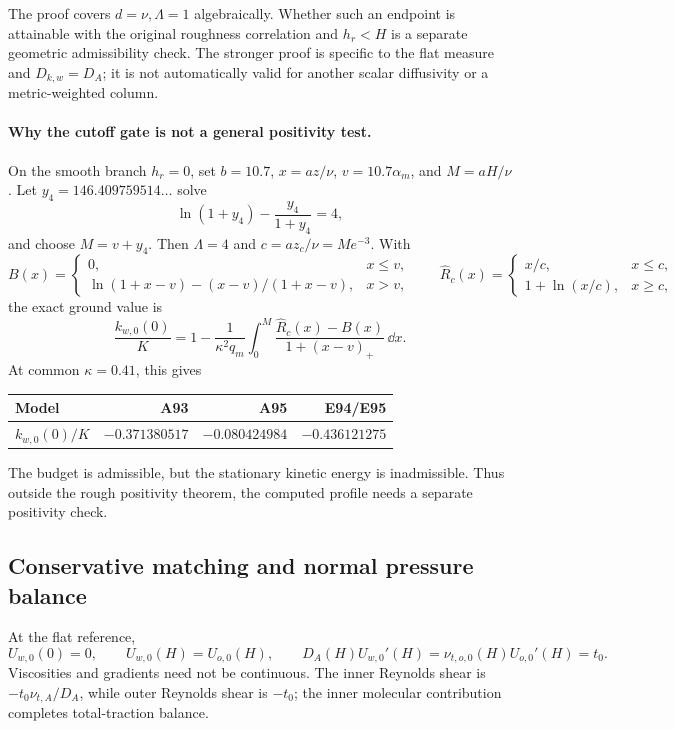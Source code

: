The proof covers \(d=\nu,\Lambda=1\) algebraically.
Whether such an endpoint is attainable with the original
roughness correlation and \(h_r<H\) is a separate geometric
admissibility check. The stronger proof is specific to the
flat measure and \(D_{k,w}=D_A\); it is not automatically valid
for another scalar diffusivity or a metric-weighted column.

\paragraph{Why the cutoff gate is not a general positivity test.}
On the smooth branch \(h_r=0\), set \(b=10.7\),
\(x=az/\nu\), \(v=10.7\alpha_m\), and
\(M=aH/\nu\). Let \(y_4=146.409759514\ldots\) solve
\[
 \ln(1+y_4)-\frac{y_4}{1+y_4}=4,
\]
and choose \(M=v+y_4\). Then \(\Lambda=4\) and
\(c=az_c/\nu=M e^{-3}\). With
\[
 B(x)=
 \begin{cases}
 0,&x\le v,\\
 \ln(1+x-v)-(x-v)/(1+x-v),&x>v,
 \end{cases}
 \qquad
 \widehat R_c(x)=
 \begin{cases}x/c,&x\le c,\\1+\ln(x/c),&x\ge c,\end{cases}
\]
the exact ground value is
\begin{equation}
 \frac{k_{w,0}(0)}K
 =1-\frac{1}{\kappa^2q_m}
   \int_0^M\frac{\widehat R_c(x)-B(x)}{1+(x-v)_+}\,\dd x.
 \label{mawf:smooth-counterexample}
\end{equation}
At common \(\kappa=0.41\), this gives
\begin{center}
\begin{tabular}{@{}lrrr@{}}
\toprule
Model&A93&A95&E94/E95\\
\midrule
\(k_{w,0}(0)/K\)&\(-0.371380517\)&\(-0.080424984\)&\(-0.436121275\)\\
\bottomrule
\end{tabular}
\end{center}
The budget is admissible, but the stationary kinetic energy is
inadmissible. Thus outside the rough positivity theorem,
the computed profile needs a separate positivity check.

\subsection{Conservative matching and normal pressure balance}
\label{mawf:matching}
At the flat reference,
\begin{equation}
 U_{w,0}(0)=0,\qquad U_{w,0}(H)=U_{o,0}(H),\qquad
 D_A(H)U_{w,0}'(H)=\nu_{t,o,0}(H)U_{o,0}'(H)=t_0.
 \label{mawf:traction}
\end{equation}
Viscosities and gradients need not be continuous.
The inner Reynolds shear is
\(-t_0\nu_{t,A}/D_A\), while outer Reynolds shear is \(-t_0\);
the inner molecular contribution completes total-traction balance.

